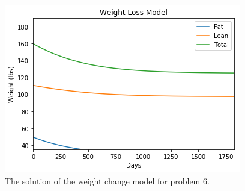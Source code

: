 \begin{figure}
\centering
\includegraphics[width=\textwidth]{figures/weightloss_graph.png}
\caption{The solution of the weight change model for problem 6.}
\label{fig:weightloss}
\end{figure}

